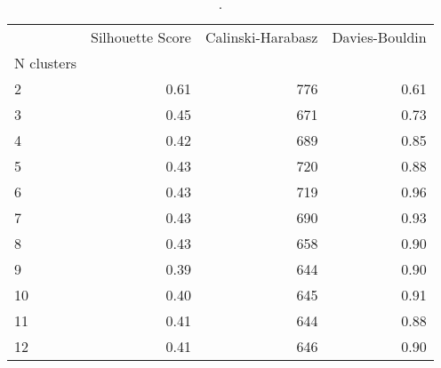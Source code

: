 \begin{table}[H]
\centering
\caption{.}
\label{tab:cluster_metrics}
\begin{tabular}{lrrr}
\toprule
 & Silhouette Score & Calinski-Harabasz & Davies-Bouldin \\
N clusters &  &  &  \\
\midrule
2 & {\cellcolor[HTML]{08306B}} \color[HTML]{F1F1F1} 0.61 & {\cellcolor[HTML]{00441B}} \color[HTML]{F1F1F1} 776 & {\cellcolor[HTML]{FFF5F0}} \color[HTML]{000000} 0.61 \\
3 & {\cellcolor[HTML]{AED1E7}} \color[HTML]{000000} 0.45 & {\cellcolor[HTML]{68BE70}} \color[HTML]{000000} 671 & {\cellcolor[HTML]{FCA183}} \color[HTML]{000000} 0.73 \\
4 & {\cellcolor[HTML]{CDE0F1}} \color[HTML]{000000} 0.42 & {\cellcolor[HTML]{48AE60}} \color[HTML]{F1F1F1} 689 & {\cellcolor[HTML]{E93529}} \color[HTML]{F1F1F1} 0.85 \\
5 & {\cellcolor[HTML]{C7DCEF}} \color[HTML]{000000} 0.43 & {\cellcolor[HTML]{238B45}} \color[HTML]{F1F1F1} 720 & {\cellcolor[HTML]{D42121}} \color[HTML]{F1F1F1} 0.88 \\
6 & {\cellcolor[HTML]{C4DAEE}} \color[HTML]{000000} 0.43 & {\cellcolor[HTML]{248C46}} \color[HTML]{F1F1F1} 719 & {\cellcolor[HTML]{860811}} \color[HTML]{F1F1F1} 0.96 \\
7 & {\cellcolor[HTML]{C2D9EE}} \color[HTML]{000000} 0.43 & {\cellcolor[HTML]{45AD5F}} \color[HTML]{F1F1F1} 690 & {\cellcolor[HTML]{AC1117}} \color[HTML]{F1F1F1} 0.93 \\
8 & {\cellcolor[HTML]{C7DCEF}} \color[HTML]{000000} 0.43 & {\cellcolor[HTML]{7DC87E}} \color[HTML]{000000} 658 & {\cellcolor[HTML]{C5171C}} \color[HTML]{F1F1F1} 0.90 \\
9 & {\cellcolor[HTML]{E7F0FA}} \color[HTML]{000000} 0.39 & {\cellcolor[HTML]{94D390}} \color[HTML]{000000} 644 & {\cellcolor[HTML]{C5171C}} \color[HTML]{F1F1F1} 0.90 \\
10 & {\cellcolor[HTML]{DEEBF7}} \color[HTML]{000000} 0.40 & {\cellcolor[HTML]{94D390}} \color[HTML]{000000} 645 & {\cellcolor[HTML]{BE151A}} \color[HTML]{F1F1F1} 0.91 \\
11 & {\cellcolor[HTML]{D9E7F5}} \color[HTML]{000000} 0.41 & {\cellcolor[HTML]{95D391}} \color[HTML]{000000} 644 & {\cellcolor[HTML]{D42121}} \color[HTML]{F1F1F1} 0.88 \\
12 & {\cellcolor[HTML]{D4E4F4}} \color[HTML]{000000} 0.41 & {\cellcolor[HTML]{92D28F}} \color[HTML]{000000} 646 & {\cellcolor[HTML]{C8171C}} \color[HTML]{F1F1F1} 0.90 \\

\end{tabular}
\end{table}
